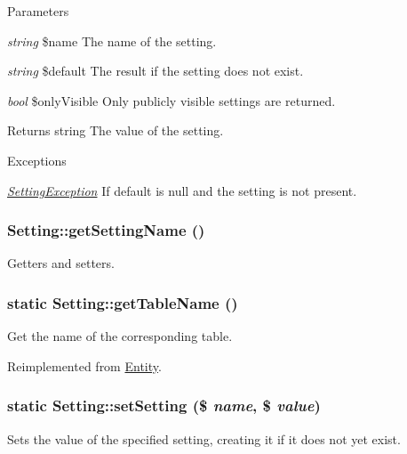 \begin{DoxyParams}{Parameters}
\item[{\em string}]\$name The name of the setting. \item[{\em string}]\$default The result if the setting does not exist. \item[{\em bool}]\$onlyVisible Only publicly visible settings are returned.\end{DoxyParams}
\begin{DoxyReturn}{Returns}
string The value of the setting.
\end{DoxyReturn}

\begin{DoxyExceptions}{Exceptions}
\item[{\em \hyperlink{classSettingException}{SettingException}}]If default is null and the setting is not present. \end{DoxyExceptions}
\hypertarget{classSetting_afc1e17b405d06caab9faf3362d3522b4}{
\subsubsection[{getSettingName}]{\setlength{\rightskip}{0pt plus 5cm}Setting::getSettingName ()}}
\label{classSetting_afc1e17b405d06caab9faf3362d3522b4}
Getters and setters. \hypertarget{classSetting_ada9934fb4f6bddcf5250494b63d81c5e}{
\subsubsection[{getTableName}]{\setlength{\rightskip}{0pt plus 5cm}static Setting::getTableName ()}}
\label{classSetting_ada9934fb4f6bddcf5250494b63d81c5e}
Get the name of the corresponding table. 

Reimplemented from \hyperlink{classEntity_a8305fd94740ac62cbafb9de76567ce37}{Entity}.

\hypertarget{classSetting_adbcf1f8af6c1832b0ad59d39b550a6d0}{
\subsubsection[{setSetting}]{\setlength{\rightskip}{0pt plus 5cm}static Setting::setSetting (\$ {\em name}, \/  \$ {\em value})}}
\label{classSetting_adbcf1f8af6c1832b0ad59d39b550a6d0}
Sets the value of the specified setting, creating it if it does not yet exist.


